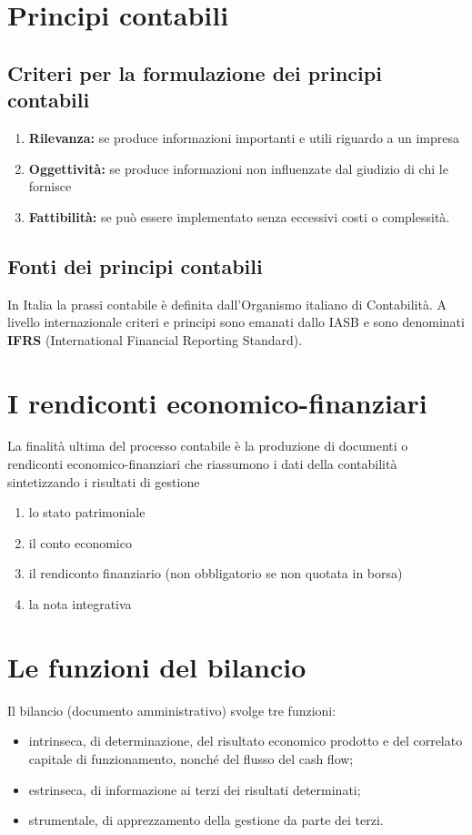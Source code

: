 \documentclass{report}
\begin{document}
	\section{Principi contabili}
	\subsection{Criteri per la formulazione dei principi contabili}
	\begin{enumerate}
		\item \textbf{Rilevanza:} se produce informazioni importanti e utili riguardo a un impresa
		\item \textbf{Oggettività:} se produce informazioni non influenzate dal giudizio di chi le fornisce
		\item \textbf{Fattibilità:} se può essere implementato senza eccessivi costi o complessità.
	\end{enumerate}
	\subsection{Fonti dei principi contabili}
	In Italia la prassi contabile è definita dall'Organismo italiano di Contabilità. A livello internazionale criteri e principi sono emanati dallo IASB e sono denominati \textbf{IFRS} (International Financial Reporting Standard).
	\section{I rendiconti economico-finanziari}
	La finalità ultima del processo contabile è la produzione di documenti o rendiconti economico-finanziari che riassumono i dati della contabilità sintetizzando i risultati di gestione
	\begin{enumerate}
		\item lo stato patrimoniale
		\item il conto economico
		\item il rendiconto finanziario (non obbligatorio se non quotata in borsa)
		\item la nota integrativa
	\end{enumerate}
	\section{Le funzioni del bilancio}
	Il bilancio (documento amministrativo) svolge tre funzioni:
	\begin{itemize}
		\item intrinseca, di determinazione, del risultato economico prodotto e del correlato capitale di funzionamento, nonché del flusso del cash flow;
		\item estrinseca, di informazione ai terzi dei risultati determinati;
		\item strumentale, di apprezzamento della gestione da parte dei terzi.
	\end{itemize}
\end{document}
